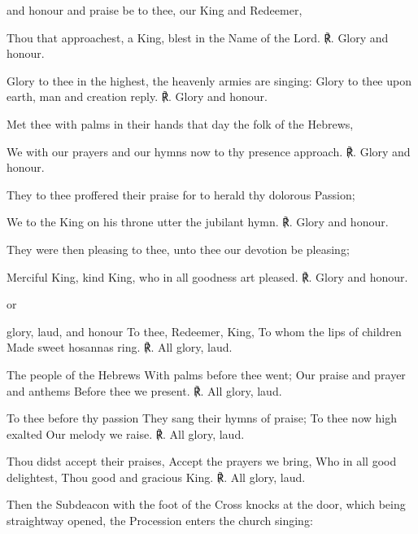  and honour and praise be to thee, our King and Redeemer,\par
{}
Thou that approachest, a King, blest in the Name of the Lord. ℟. Glory and honour.\par
Glory to thee in the highest, the heavenly armies are singing: Glory to thee upon earth, man and creation reply. ℟. Glory and honour.\par
Met thee with palms in their hands that day the folk of the Hebrews,\par
We with our prayers and our hymns now to thy presence approach. ℟. Glory and honour.\par
They to thee proffered their praise for to herald thy dolorous Passion;\par
We to the King on his throne utter the jubilant hymn. ℟. Glory and honour.\par
They were then pleasing to thee, unto thee our devotion be pleasing;\par
Merciful King, kind King, who in all goodness art pleased. ℟. Glory and honour.\par
\begin{inhead}
    or
\end{inhead}
 glory, laud, and honour To thee, Redeemer, King, To whom the lips of children Made sweet hosannas ring. ℟. All glory, laud.\par
{}
The people of the Hebrews With palms before thee went; Our praise and prayer and anthems Before thee we present. ℟. All glory, laud.\par
To thee before thy passion They sang their hymns of praise; To thee now high exalted Our melody we raise. ℟. All glory, laud.\par
Thou didst accept their praises, Accept the prayers we bring, Who in all good delightest, Thou good and gracious King. ℟. All glory, laud.\par
\begin{rubric}
    Then the Subdeacon with the foot of the Cross knocks at the door, which being straightway opened, the Procession enters the church singing:
\end{rubric}\par
